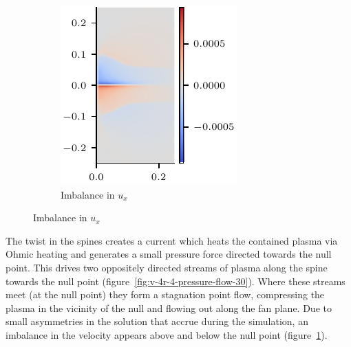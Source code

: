 \begin{figure}[t]
\begin{subfigure}{0.32\textwidth}
      \includegraphics[width=\linewidth]{v-4r-4-vx-imbalance-30.pdf}
      \caption{Imbalance in $u_x$}
      \label{fig:v-4r-4-vx-imbalance-30}
    \end{subfigure}

\label{fig:imbalance_in_velocity}
\end{figure}

The twist in the spines creates a current which heats the contained plasma via Ohmic heating and generates a small pressure force directed towards the null point. This drives two oppositely directed streams of plasma along the spine towards the null point (figure~\ref{fig:v-4r-4-pressure-flow-30}). Where these streams meet (at the null point) they form a stagnation point flow, compressing the plasma in the vicinity of the null and flowing out along the fan plane. Due to small asymmetries in the solution that accrue during the simulation, an imbalance in the velocity appears above and below the null point (figure~\ref{fig:v-4r-4-vx-imbalance-30}).

